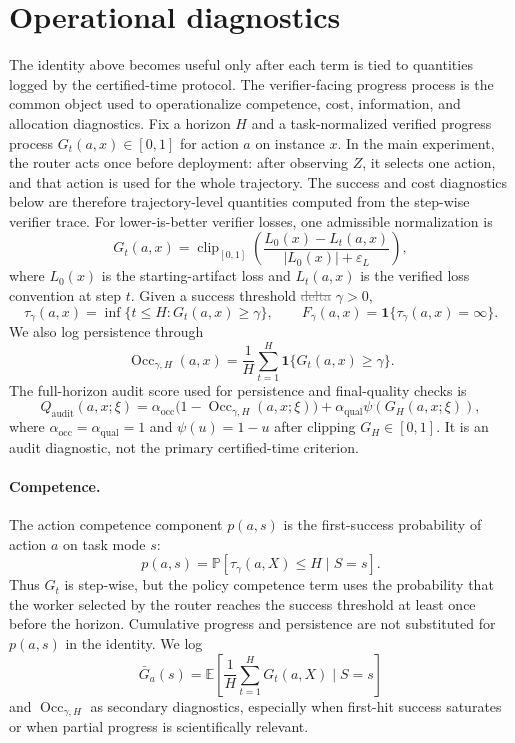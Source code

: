 \documentclass{article}
\newcommand{\oldtext}[1]{\textcolor{gray}{\sout{#1}}}
\newcommand{\newtext}[1]{\textcolor{green!50!black}{#1}}
\DeclareMathOperator{\Occ}{Occ}
\newcommand{\E}{\mathbb{E}}
\newcommand{\Prb}{\mathbb{P}}
\newcommand{\eps}{\varepsilon}
\newcommand{\one}{\mathbf{1}}
\begin{document}
\section{Operational diagnostics}
\label{subsec:bridge}

The identity above becomes useful only after each term is tied to quantities logged by the certified-time protocol.
The verifier-facing progress process is the common object used to operationalize competence, cost, information, and allocation diagnostics.
Fix a horizon $H$ and a task-normalized verified progress process $G_t(a,x)\in[0,1]$ for action $a$ on instance $x$.
In the main experiment, the router acts once before deployment: after observing $Z$, it selects one action, and that action is used for the whole trajectory.
The success and cost diagnostics below are therefore trajectory-level quantities computed from the step-wise verifier trace.
For lower-is-better verifier losses, one admissible normalization is
\[
G_t(a,x)
=
\operatorname{clip}_{[0,1]}\!\left(
\frac{L_0(x)-L_t(a,x)}{|L_0(x)|+\eps_L}
\right),
\]
where $L_0(x)$ is the starting-artifact loss and $L_t(a,x)$ is the verified loss convention at step $t$.
Given a success threshold \oldtext{delta} \newtext{\(\gamma>0\)},
\[
\tau_\gamma(a,x)=\inf\{t\le H:G_t(a,x)\ge \gamma\},
\qquad
F_\gamma(a,x)=\one\{\tau_\gamma(a,x)=\infty\}.
\]
We also log persistence through
\[
\Occ_{\gamma,H}(a,x)=\frac{1}{H}\sum_{t=1}^H \one\{G_t(a,x)\ge \gamma\}.
\]
The full-horizon audit score used for persistence and final-quality checks is
\begin{equation}
Q_{\mathrm{audit}}(a,x;\xi)
=
\alpha_{\mathrm{occ}}\bigl(1-\Occ_{\gamma,H}(a,x;\xi)\bigr)
+\alpha_{\mathrm{qual}}\psi(G_H(a,x;\xi)),
\label{eq:audit-loss}
\end{equation}
where \(\alpha_{\mathrm{occ}}=\alpha_{\mathrm{qual}}=1\) and \(\psi(u)=1-u\) after clipping \(G_H\in[0,1]\).
It is an audit diagnostic, not the primary certified-time criterion.

\paragraph{Competence.}
The action competence component $p(a,s)$ is the first-success probability of action $a$ on task mode $s$:
\[
p(a,s)=\Prb[\tau_\gamma(a,X)\le H\mid S=s].
\]
Thus $G_t$ is step-wise, but the policy competence term uses the probability that the worker selected by the router reaches the success threshold at least once before the horizon.
Cumulative progress and persistence are not substituted for $p(a,s)$ in the identity.
We log
\[
\bar G_a(s)=\E\!\left[\frac{1}{H}\sum_{t=1}^H G_t(a,X)\mid S=s\right]
\]
and \(\Occ_{\gamma,H}\) as secondary diagnostics, especially when first-hit success saturates or when partial progress is scientifically relevant.
\end{document}
